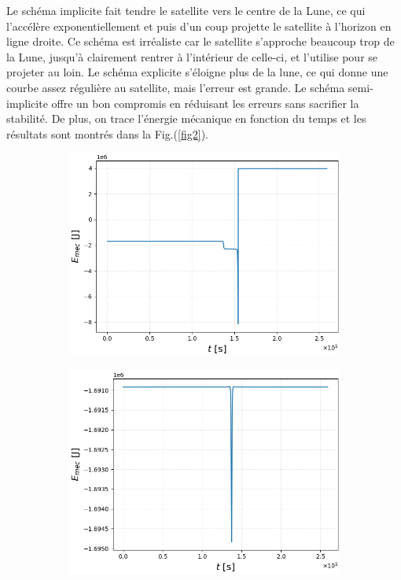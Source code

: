 \documentclass[a4paper,12pt,twoside]{article}
\begin{document}
\vspace{-1cm}

Le schéma implicite fait tendre le satellite vers le centre de la Lune, ce qui l'accélère exponentiellement et puis d'un coup projette le satellite à l'horizon en ligne droite. Ce schéma est irréaliste car le satellite s'approche beaucoup trop de la Lune, jusqu'à clairement rentrer à l'intérieur de celle-ci, et l'utilise pour se projeter au loin.
Le schéma explicite s’éloigne plus de la lune, ce qui donne une courbe assez régulière au satellite, mais l'erreur est grande.
Le schéma semi-implicite offre un bon compromis en réduisant les erreurs sans sacrifier la stabilité. De plus, on trace l'énergie mécanique en fonction du temps et les résultats sont montrés dans la Fig.(\ref{fig2}).


\begin{figure}[H]
\centering
\begin{subfigure}{0.45\textwidth}  %
    \centering  %
    \includegraphics[scale=0.4]{Graphes/E_mec_alpha_0.png}
\end{subfigure}
\hspace{0.07\textwidth}
\begin{subfigure}{0.45\textwidth}  %
    \centering  %
    \includegraphics[scale=0.4]{Graphes/E_mec_alpha05.png}

\end{subfigure}
\end{figure}
\end{document}
